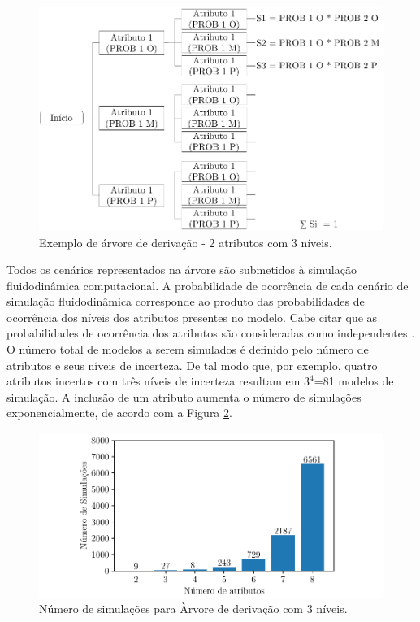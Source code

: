\begin{figure}[H]
    \centering
    \includegraphics[scale=1]{Figuras/derivacao.pdf}
    \caption{Exemplo de árvore de derivação - 2 atributos com 3 níveis.}
    \label{fig:arvorederivacao}
\end{figure}

Todos os cenários representados na árvore são submetidos à simulação fluidodinâmica computacional.
A probabilidade de ocorrência de cada cenário de simulação fluidodinâmica corresponde ao produto das probabilidades de ocorrência dos níveis dos atributos presentes no modelo. Cabe citar que as probabilidades de ocorrência dos atributos são consideradas como independentes \cite{risso1}. 
O número total de modelos a serem simulados é definido pelo número de atributos e seus níveis de incerteza. De tal modo que, por exemplo, quatro atributos incertos com três níveis de incerteza resultam em $3^{4}$=81  modelos de simulação. A inclusão de um atributo aumenta o número de simulações exponencialmente, de acordo com a Figura \ref{fig:arvorederivacao2}.

\begin{figure}[!h]
    \centering
    \includegraphics[scale=1]{Figuras/arvoredevr.pdf}
    \caption{Número de simulações para Àrvore de derivação com 3 níveis.}
    \label{fig:arvorederivacao2}
\end{figure}


